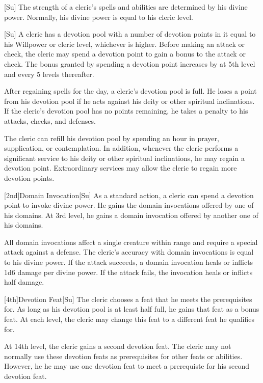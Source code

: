 [Su]
The strength of a cleric's spells and abilities are determined by his divine power.
Normally, his divine power is equal to his cleric level.

[Su]
A cleric has a devotion pool with a number of devotion points in it equal to his Willpower or cleric level, whichever is higher.
Before making an attack or check, the cleric may spend a devotion point to gain a  bonus to the attack or check.
The bonus granted by spending a devotion point increases by  at 5th level and every 5 levels thereafter.

After regaining spells for the day, a cleric's devotion pool is full.
He loses a point from his devotion pool if he acts against his deity or other spiritual inclinations.
If the cleric's devotion pool has no points remaining, he takes a  penalty to his attacks, checks, and defenses.

The cleric can refill his devotion pool by spending an hour in prayer, supplication, or contemplation.
In addition, whenever the cleric performs a significant service to his deity or other spiritual inclinations, he may regain a devotion point.
Extraordinary services may allow the cleric to regain more devotion points.

[2nd]{Domain Invocation}[Su]
As a standard action, a cleric can spend a devotion point to invoke divine power.
He gains the domain invocations offered by one of his domains.
At 3rd level, he gains a domain invocation offered by another one of his domains.

All domain invocations affect a single creature within \rngmed range and require a special attack against a defense.
The cleric's accuracy with domain invocations is equal to his divine power.
If the attack succeeds, a domain invocation heals or inflicts 1d6 damage per divine power.
If the attack fails, the invocation heals or inflicts half damage.

[4th]{Devotion Feat}[Su]
The cleric chooses a feat that he meets the prerequisites for.
As long as his devotion pool is at least half full, he gains that feat as a bonus feat.
At each level, the cleric may change this feat to a different feat he qualifies for.

At 14th level, the cleric gains a second devotion feat.
The cleric may not normally use these devotion feats as prerequisites for other feats or abilities.
However, he he may use one devotion feat to meet a prerequiste for his second devotion feat.


